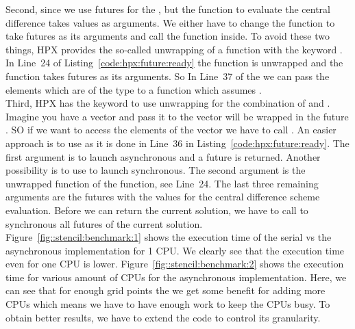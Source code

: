 \documentclass[11pt,fleqn]{book} %
\begin{document}
Second, since we use futures for the , but the function to evaluate the central difference  takes  values as arguments. We either have to change the function to take futures as its arguments and call the  function inside. To avoid these two things, HPX provides the so-called unwrapping of a function with the keyword . In Line~24 of Listing~\ref{code:hpx:future:ready} the function  is unwrapped and the function  takes futures as its arguments. So In Line~37 of the  we can pass the  elements which are of the type  to a function which assumes .\\

Third, HPX has the keyword  to use unwrapping for the combination of  and . Imagine you have a vector  and pass it to  the vector  will be wrapped in the future . SO if we want to access the elements of the vector we have to call . An easier approach is to use  as it is done in Line~36 in Listing~\ref{code:hpx:future:ready}. The first argument is  to launch asynchronous and a future is returned. Another possibility is to use  to launch synchronous. The second argument is the unwrapped function of the  function, see Line~24. The last three remaining arguments are the futures with the values for the central difference scheme evaluation. Before we can return the current solution, we have to call  to synchronous all futures of the current solution.\\

Figure~\ref{fig::stencil:benchmark:1} shows the execution time of the serial vs the asynchronous implementation for 1 CPU. We clearly see that the execution time even for one CPU is lower. Figure~\ref{fig::stencil:benchmark:2} shows the execution time for various amount of CPUs for the asynchronous implementation. Here, we can see that for enough grid points the we get some benefit for adding more CPUs which means we have to have enough work to keep the CPUs busy. To obtain better results, we have to extend the code to control its granularity.
\end{document}
